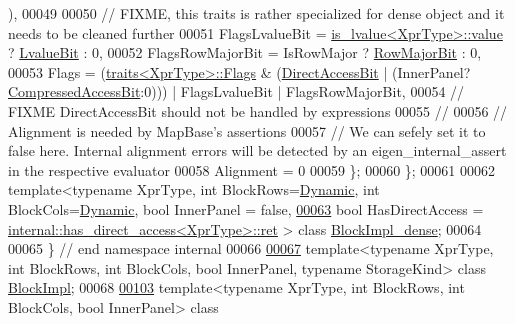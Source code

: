 \begin{DoxyCode}
      ),
00049 
00050     \textcolor{comment}{// FIXME, this traits is rather specialized for dense object and it needs to be cleaned further}
00051     FlagsLvalueBit = \hyperlink{struct_eigen_1_1internal_1_1is__lvalue}{is\_lvalue<XprType>::value} ? 
      \hyperlink{group__flags_gae2c323957f20dfdc6cb8f44428eaec1a}{LvalueBit} : 0,
00052     FlagsRowMajorBit = IsRowMajor ? \hyperlink{group__flags_gae4f56c2a60bbe4bd2e44c5b19cbe8762}{RowMajorBit} : 0,
00053     Flags = (\hyperlink{struct_eigen_1_1internal_1_1traits}{traits<XprType>::Flags} & (\hyperlink{group__flags_gabf1e9d0516a933445a4c307ad8f14915}{DirectAccessBit} | (InnerPanel?
      \hyperlink{group__flags_gaed0244284da47a2b8661261431173caf}{CompressedAccessBit}:0))) | FlagsLvalueBit | FlagsRowMajorBit,
00054     \textcolor{comment}{// FIXME DirectAccessBit should not be handled by expressions}
00055     \textcolor{comment}{// }
00056     \textcolor{comment}{// Alignment is needed by MapBase's assertions}
00057     \textcolor{comment}{// We can sefely set it to false here. Internal alignment errors will be detected by an
       eigen\_internal\_assert in the respective evaluator}
00058     Alignment = 0
00059   \};
00060 \};
00061 
00062 \textcolor{keyword}{template}<\textcolor{keyword}{typename} XprType, \textcolor{keywordtype}{int} BlockRows=\hyperlink{namespace_eigen_ad81fa7195215a0ce30017dfac309f0b2}{Dynamic}, \textcolor{keywordtype}{int} BlockCols=\hyperlink{namespace_eigen_ad81fa7195215a0ce30017dfac309f0b2}{Dynamic}, \textcolor{keywordtype}{bool} InnerPanel = \textcolor{keyword}{
      false},
\hyperlink{class_eigen_1_1internal_1_1_block_impl__dense}{00063}          \textcolor{keywordtype}{bool} HasDirectAccess = \hyperlink{struct_eigen_1_1internal_1_1has__direct__access}{internal::has\_direct\_access<XprType>::ret}
      > \textcolor{keyword}{class }\hyperlink{class_eigen_1_1internal_1_1_block_impl__dense}{BlockImpl\_dense};
00064          
00065 \} \textcolor{comment}{// end namespace internal}
00066 
\hyperlink{class_eigen_1_1_block_impl}{00067} \textcolor{keyword}{template}<\textcolor{keyword}{typename} XprType, \textcolor{keywordtype}{int} BlockRows, \textcolor{keywordtype}{int} BlockCols, \textcolor{keywordtype}{bool} InnerPanel, \textcolor{keyword}{typename} StorageKind> \textcolor{keyword}{class }
      \hyperlink{class_eigen_1_1_block_impl}{BlockImpl};
00068 
\hyperlink{group___core___module}{00103} \textcolor{keyword}{template}<\textcolor{keyword}{typename} XprType, \textcolor{keywordtype}{int} BlockRows, \textcolor{keywordtype}{int} BlockCols, \textcolor{keywordtype}{bool} InnerPanel> \textcolor{keyword}{class }

\end{DoxyCode}
